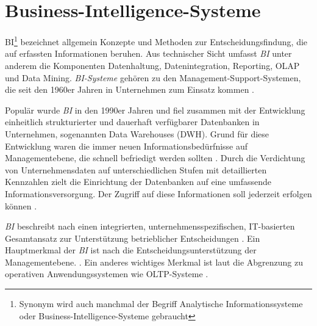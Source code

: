 

\section{Business-Intelligence-Systeme}
\acrfull{BI}\footnote{Synonym wird auch manchmal der Begriff Analytische Informationssysteme oder Business-Intelligence-Systeme gebraucht}
bezeichnet allgemein Konzepte und Methoden zur Entscheidungsfindung, die auf
erfassten Informationen beruhen. Aus technischer Sicht umfasst \textit{\acrshort{BI}} unter anderem die Komponenten Datenhaltung, Datenintegration, Reporting, \acrfull{OLAP} und Data Mining.
\textit{\acrshort{BI}-Systeme} gehören zu den Management-Support-Systemen, die seit den 1960er Jahren in Unternehmen zum Einsatz kommen \cite[vgl.][83]{gronwald_integrierte_2020}.

Populär wurde \textit{\acrshort{BI}} in den 1990er Jahren und fiel zusammen mit der 
Entwicklung einheitlich strukturierter und dauerhaft verfügbarer Datenbanken in Unternehmen, sogenannten Data Warehouses (DWH).
Grund für diese Entwicklung waren die immer neuen Informationsbedürfnisse auf Managementebene, 
die schnell befriedigt werden sollten \cite[vgl.][268 f.]{abts_grundkurs_2017}.
Durch die Verdichtung von Unternehmensdaten auf unterschiedlichen Stufen mit detaillierten Kennzahlen
zielt die Einrichtung der Datenbanken auf eine umfassende Informationsversorgung.
Der Zugriff auf diese Informationen soll jederzeit erfolgen können \cite[vgl.][267]{abts_grundkurs_2017}. 

\textit{\acrshort{BI}} beschreibt nach \citeauthor{abts_grundkurs_2017} einen integrierten, unternehmensspezifischen,
IT-basierten Gesamtansatz zur Unterstützung betrieblicher Entscheidungen \cite[vgl.][270]{abts_grundkurs_2017}. 
Ein Hauptmerkmal der \textit{\acrshort{BI}} ist nach  die Entscheidungsunterstützung der Managementebene.
\cite[vgl.][111]{linden_geschaftsmodellbasierte_2016}. Ein anderes wichtiges Merkmal ist laut \citeauthor{abts_grundkurs_2017} die Abgrenzung zu operativen
Anwendungssystemen wie \acrfull{OLTP}-Systeme \cite[vgl.][267]{abts_grundkurs_2017}. 


